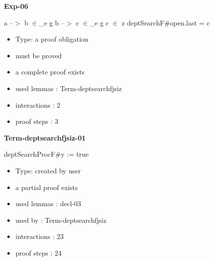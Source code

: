 \documentclass[a4paper]{article}
\begin{document}
\medskip

{\LARGE\bf Exp-06}\label{lemma-Exp-06}

\medskip

 \Fol a --$>$ b $\in$\_e g \And b --$>$ c $\in$\_e g \And c $\in$ z \Imp \Do deptSearchF\#\Dc open.last = c

\begin{itemize}

\item Type: a proof obligation

\item       must be proved
\item       a complete proof exists
\item       used lemmas  : Term-deptsearchfjsiz
\item       interactions : 2
\item       proof steps  : 3
\end{itemize}

\medskip

{\LARGE\bf Term-deptsearchfjsiz-01}\label{lemma-Term-deptsearchfjsiz-01}

\medskip

 \Fol \Do deptSearchProcF\#\Dc \Do y := \Dc true

\begin{itemize}

\item Type: created by user

\item       a partial proof exists
\item       used lemmas  : decl-03
\item       used by      : Term-deptsearchfjsiz
\item       interactions : 23
\item       proof steps  : 24
\end{itemize}

\medskip
\end{document}
